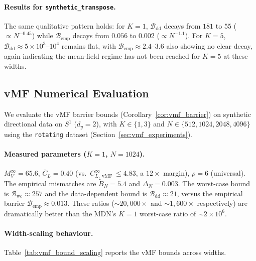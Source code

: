 \documentclass[11pt]{article}
\newcommand{\cB}{\mathcal{B}}
\DeclareMathOperator{\vmf}{vMF}
\begin{document}
\paragraph{Results for \texttt{synthetic\_transpose}.}
The same qualitative pattern holds:
for $K=1$, $\cB_{\mathrm{dd}}$ decays from $181$ to $55$
($\propto N^{-0.45}$)
while $\cB_{\mathrm{emp}}$ decays from $0.056$ to $0.002$
($\propto N^{-1.1}$).
For $K=5$, $\cB_{\mathrm{dd}} \approx 5 \times 10^3$--$10^4$
remains flat, with $\cB_{\mathrm{emp}} \approx 2.4$--$3.6$
also showing no clear decay, again indicating
the mean-field regime has not been reached for $K=5$
at these widths.

\subsection{vMF Numerical Evaluation}\label{app:vmf_numerical}

We evaluate the vMF barrier bounds
(Corollary~\ref{cor:vmf_barrier}) on synthetic directional data on
$S^1$ ($d_y = 2$), with $K \in \{1, 3\}$ and
$N \in \{512, 1024, 2048, 4096\}$
using the \texttt{rotating} dataset
(Section~\ref{sec:vmf_experiments}).

\paragraph{Measured parameters ($K=1$, $N=1024$).}
$M_V^\infty = 65.6$,
$\bar C_L = 0.40$
(vs.\ $C_{L,\vmf}^\infty \le 4.83$, a $12\times$ margin),
$\rho = 6$ (universal).
The empirical mismatches are
$\tilde B_N = 5.4$ and $\Delta_N = 0.003$.
The worst-case bound is
$\cB_{\mathrm{wc}} \approx 257$
and the data-dependent bound is
$\cB_{\mathrm{dd}} \approx 21$,
versus the empirical barrier $\cB_{\mathrm{emp}} \approx 0.013$.
These ratios ($\sim\!20{,}000\times$ and $\sim\!1{,}600\times$
respectively) are dramatically better than the MDN's $K=1$
worst-case ratio of $\sim\!2 \times 10^6$.

\paragraph{Width-scaling behaviour.}
Table~\ref{tab:vmf_bound_scaling} reports the vMF bounds across widths.
\end{document}
